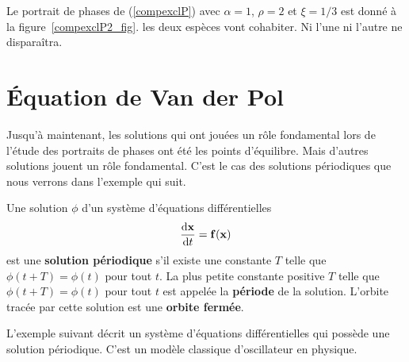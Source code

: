 {\begin{egg}
Le portrait de phases de (\ref{compexclP}) avec $\alpha =1$, $\rho=2$
et $\xi = 1/3$ est donné à la figure~\ref{compexclP2_fig}.  les deux
espèces vont cohabiter.  Ni l'une ni l'autre ne disparaîtra.

\label{COMPEXCL2}
\end{egg}


\section{\'Equation de Van der Pol}

Jusqu'à maintenant, les solutions qui ont jouées un rôle fondamental
lors de l'étude des portraits de phases ont été les points
d'équilibre.  Mais d'autres solutions jouent un rôle fondamental.
C'est le cas des solutions périodiques que nous verrons dans l'exemple
qui suit.

\begin{defn}
Une solution $\phi$ d'un système d'équations différentielles
\[
\frac{\mathrm{d}\mathbf{x}}{\mathrm{d}t} = \mathbf{f}(\mathbf{x})
\]
est une {\bfseries solution périodique} s'il existe une constante $T$ telle
que $\phi(t+T)=\phi(t)$ pour tout $t$.  La plus petite constante positive $T$
telle que $\phi(t+T)=\phi(t)$ pour tout $t$ est appelée la
{\bfseries période}
de la solution.  L'orbite tracée par cette solution est
une {\bfseries orbite fermée}.
\end{defn}

\begin{egg}
L'exemple suivant décrit un système d'équations différentielles qui possède
une solution périodique.  C'est un modèle classique d'oscillateur en
physique.


\end{egg}}
